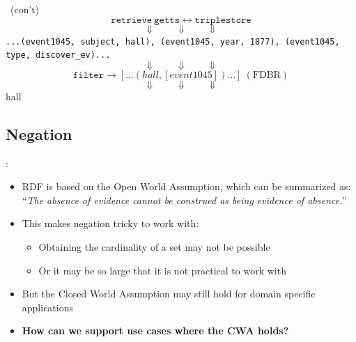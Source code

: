 \documentclass[logoontitle,tabu,supertabular,aspectratio=43]{preney-uwindsor-beamer}
\begin{document}

    \begin{frame}{\insertsubsection\ (con't)}
        \centering
        \[\mathtt{retrieve}\ \mathtt{getts} \longleftrightarrow \mathtt{triplestore} \]
        \[\Downarrow \qquad \Downarrow \qquad \Downarrow \]
        \texttt{...(event1045, subject, hall), (event1045, year, 1877), (event1045, type, discover\_ev)...}
        \[\Downarrow \qquad \Downarrow \qquad \Downarrow \]
        \[\mathtt{filter} \longrightarrow \left[\ldots\left(hall, \left[event1045\right]\right)\ldots\right]\ \mathrm{(FDBR)}\]
        \[\Downarrow \qquad \Downarrow \qquad \Downarrow \]
        hall
    \end{frame}

    \subsection{Negation}
    \begin{frame}{\insertsection: \insertsubsection}
        \begin{itemize}
            \item RDF is based on the Open World Assumption, which can be summarized as: \linebreak
            ``\textit{The absence of evidence cannot be construed as being evidence of absence.}''
            \item This makes negation tricky to work with:
            \begin{itemize}
                \item Obtaining the cardinality of a set may not be possible
                \item Or it may be so large that it is not practical to work with
            \end{itemize}
            \item But the Closed World Assumption may still hold for domain specific applications
            \item \textbf{How can we support use cases where the CWA holds?}
        \end{itemize}
    \end{frame}
\end{document}
